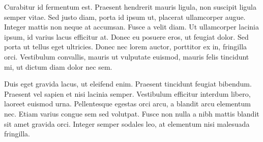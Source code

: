 \documentclass{IEEEtran}
\begin{document}
Curabitur id fermentum est. Praesent hendrerit mauris ligula, non suscipit ligula semper vitae. Sed justo diam, porta id ipsum ut, placerat ullamcorper augue. Integer mattis non neque at accumsan. Fusce a velit diam. Ut ullamcorper lacinia ipsum, id varius lacus efficitur at. Donec eu posuere eros, ut feugiat dolor. Sed porta ut tellus eget ultricies. Donec nec lorem auctor, porttitor ex in, fringilla orci. Vestibulum convallis, mauris ut vulputate euismod, mauris felis tincidunt mi, ut dictum diam dolor nec sem.

Duis eget gravida lacus, ut eleifend enim. Praesent tincidunt feugiat bibendum. Praesent vel sapien et nisi lacinia semper. Vestibulum efficitur interdum libero, laoreet euismod urna. Pellentesque egestas orci arcu, a blandit arcu elementum nec. Etiam varius congue sem sed volutpat. Fusce non nulla a nibh mattis blandit sit amet gravida orci. Integer semper sodales leo, at elementum nisi malesuada fringilla. 



\end{document}
